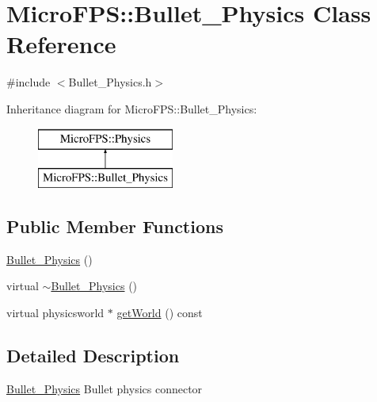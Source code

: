 \hypertarget{class_micro_f_p_s_1_1_bullet___physics}{
\section{MicroFPS::Bullet\_\-Physics Class Reference}
\label{da/d83/class_micro_f_p_s_1_1_bullet___physics}
}


{\ttfamily \#include $<$Bullet\_\-Physics.h$>$}

Inheritance diagram for MicroFPS::Bullet\_\-Physics:\begin{figure}[H]
\begin{center}
\leavevmode
\includegraphics[height=2.000000cm]{da/d83/class_micro_f_p_s_1_1_bullet___physics}
\end{center}
\end{figure}
\subsection*{Public Member Functions}
\begin{DoxyCompactItemize}
\item 
\hyperlink{class_micro_f_p_s_1_1_bullet___physics_af563f8907ea77a2ed3d4f6f23d93aacc}{Bullet\_\-Physics} ()
\item 
virtual \hyperlink{class_micro_f_p_s_1_1_bullet___physics_a876f7933df0258d84c097b3996d86c72}{$\sim$Bullet\_\-Physics} ()
\item 
virtual physicsworld $\ast$ \hyperlink{class_micro_f_p_s_1_1_bullet___physics_aece8300cdd5ba7a0971cd3c30146d2af}{getWorld} () const 
\end{DoxyCompactItemize}


\subsection{Detailed Description}
\hyperlink{class_micro_f_p_s_1_1_bullet___physics}{Bullet\_\-Physics} Bullet physics connector 

